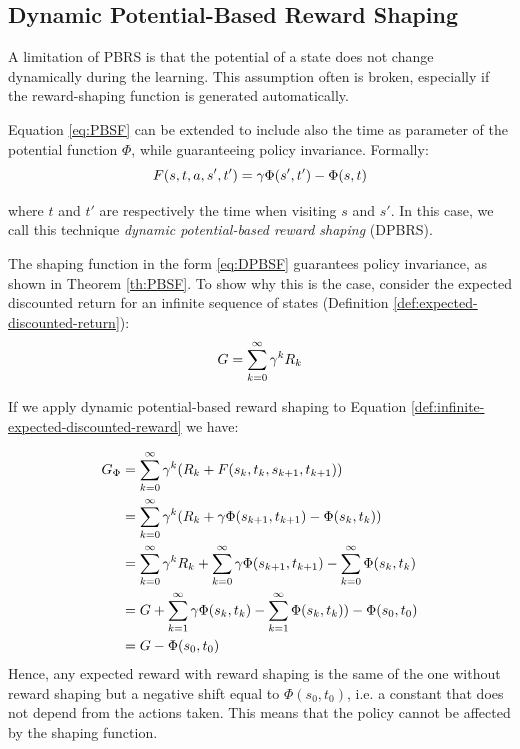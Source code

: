 \subsection{Dynamic Potential-Based Reward Shaping}\label{sect:DPBRS}
A limitation of PBRS is that the potential of a state does not change dynamically during the learning. This assumption often is broken, especially if the reward-shaping function is generated automatically.
  
Equation \ref{eq:PBSF} can be extended to include also the time as parameter of the potential function $\Phi$, while guaranteeing policy invariance. Formally:
\begin{equation}\label{eq:DPBSF}
F(s, t, a, s', t') = \gamma\Phi(s', t') - \Phi(s, t)
\end{equation}

where $t$ and $t'$ are respectively the time when visiting $s$ and $s'$. In this case, we call this technique \emph{dynamic potential-based reward shaping} (DPBRS).

The shaping function in the form \ref{eq:DPBSF} guarantees policy invariance, as shown in Theorem \ref{th:PBSF}. To show why this is the case, consider the expected discounted return for an infinite sequence of states (Definition \ref{def:expected-discounted-return}):
\begin{equation}\label{def:infinite-expected-discounted-reward}
G = \sum_{k=0}^\infty \gamma^{k}R_k
\end{equation}

If we apply dynamic potential-based reward shaping to Equation \ref{def:infinite-expected-discounted-reward} we have:

\begin{align*}
G_{\Phi} &= \sum_{k=0}^\infty \gamma^{k} (R_k + F(s_k, t_k, s_{k+1}, t_{k+1}))\\
		&= \sum_{k=0}^\infty \gamma^{k} (R_k + \gamma\Phi(s_{k+1}, t_{k+1}) - \Phi(s_{k}, t_{k}) )\\
		&= \sum_{k=0}^\infty \gamma^{k} R_k + \sum_{k=0}^\infty \gamma\Phi(s_{k+1}, t_{k+1}) - \sum_{k=0}^\infty \Phi(s_{k}, t_{k}) \\
		&= G + \sum_{k=1}^\infty \gamma\Phi(s_k, t_k) - \sum_{k=1}^\infty \Phi(s_{k}, t_{k}) ) - \Phi(s_0, t_0)\\
		&= G - \Phi(s_0, t_0)
\end{align*}
Hence, any expected reward with reward shaping is the same of the one without reward shaping but a negative shift equal to $\Phi(s_0, t_0)$, i.e. a constant that does not depend from the actions taken. This means that the policy cannot be affected by the shaping function.

